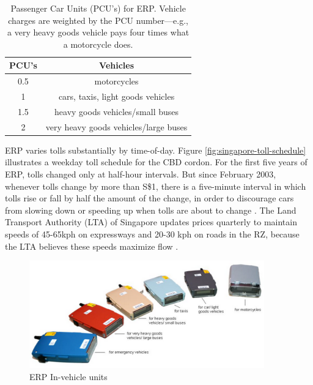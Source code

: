 \begin{table}
	\begin{tabular}{|c|c|}
		\hline 
		PCU's & Vehicles\tabularnewline                              
		\hline 
		\hline 
		0.5   & motorcycles\tabularnewline                           
		\hline 
		1     & cars, taxis, light goods vehicles\tabularnewline     
		\hline 
		1.5   & heavy goods vehicles/small buses\tabularnewline      
		\hline 
		2     & very heavy goods vehicles/large buses\tabularnewline 
		\hline 
	\end{tabular}
	
	\caption{
	Passenger Car Units (PCU's) for ERP. Vehicle charges are weighted by the PCU number---e.g., a very heavy goods vehicle pays four times what a motorcycle does. \citep{LTA2016} 
	}
	\label{tab:passenger-car-units}
\end{table}

ERP varies tolls substantially by time-of-day. Figure \ref{fig:singapore-toll-schedule} illustrates a weekday toll schedule for the CBD cordon. For the first five years of ERP, tolls changed only at half-hour intervals. But since February 2003, whenever tolls change by more than S\$1, there is a five-minute interval in which tolls rise or fall by half the amount of the change, in order to discourage cars from slowing down or speeding up when tolls are about to change \citep{Menon2004}. The Land Transport Authority (LTA) of Singapore updates prices quarterly to maintain speeds of 45-65kph on expressways and 20-30 kph on roads in the RZ, because the LTA believes these speeds maximize flow \citep{Li1999}.
	
\begin{figure}
	\includegraphics[width=4in]{../img/singapore-IUs.jpg}
	\caption{ERP In-vehicle units \citep{LTA2016}}
	\label{fig:singapore-IUs}
\end{figure}

